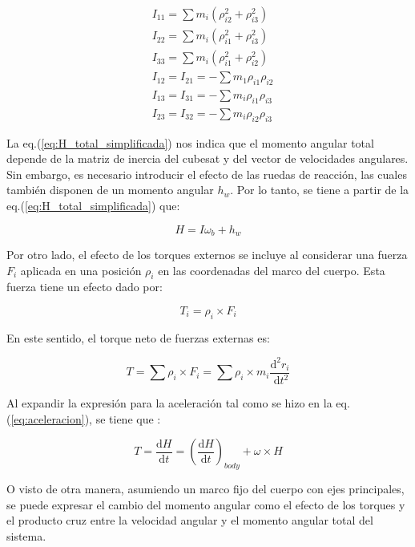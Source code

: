  $$
 \begin{aligned}
 	& I_{11}=\sum m_i\left(\rho_{i 2}^2+\rho_{i 3}^2\right) \\
 	& I_{22}=\sum m_i\left(\rho_{i 1}^2+\rho_{i 3}^2\right) \\
 	& I_{33}=\sum m_i\left(\rho_{i 1}^2+\rho_{i 2}^2\right) \\
 	& I_{12}=I_{21}=-\sum m_1 \rho_{i 1} \rho_{i 2} \\
 	& I_{13}=I_{31}=-\sum m_i \rho_{i 1} \rho_{i 3} \\
 	& I_{23}=I_{32}=-\sum m_i \rho_{i 2} \rho_{i 3}
 \end{aligned}
 $$
 
 La eq.(\ref{eq:H_total_simplificada}) nos indica que el momento angular total depende de la matriz de inercia del cubesat y del vector de velocidades angulares. Sin embargo, es necesario introducir el efecto de las ruedas de reacción, las cuales también disponen de un momento angular $h_w$. Por lo tanto, se tiene a partir de la eq.(\ref{eq:H_total_simplificada}) que: 
 
 \begin{equation}\label{eq:H_total_RW}
 	H = I\omega_b + h_w
 \end{equation}
 
 Por otro lado, el efecto de los torques externos se incluye al considerar una fuerza $F_i$ aplicada en una posición $\rho_i$ en las coordenadas del marco del cuerpo. Esta fuerza tiene un efecto dado por: 
  
 \begin{equation}
 	T_i=\rho_i \times F_i  
 \end{equation}
 
 
En este sentido, el torque neto de fuerzas externas es:

\begin{equation}
	T=\sum \rho_i \times F_i=\sum \rho_i \times m_i \frac{\mathrm{d}^2 r_i}{\mathrm{~d} t^2} 	
\end{equation}
 
 
 Al expandir la expresión para la aceleración tal como se hizo en la eq.(\ref{eq:aceleracion}), se tiene que :
 
 \begin{equation}
 	T= \frac{\mathrm{d} H}{\mathrm{d} t} = \left(\frac{\mathrm{d} H}{\mathrm{d} t}\right)_{body} + \omega \times H 	
 \end{equation}
 
 O visto de otra manera, asumiendo un marco fijo del cuerpo con ejes principales, se puede expresar el cambio del momento angular como el efecto de los torques y el producto cruz entre la velocidad angular y el momento angular total del sistema.
 
